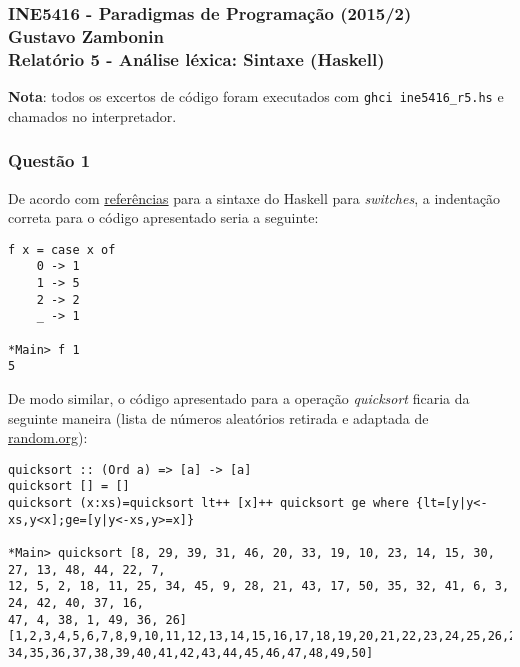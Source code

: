 \documentclass{article}
\begin{document}
\subsubsection*{INE5416 - Paradigmas de Programação (2015/2) \\
    Gustavo Zambonin \\
    Relatório 5 - Análise léxica: Sintaxe (Haskell)
}

\textbf{Nota}: todos os excertos de código foram executados com \texttt{ghci ine5416\_r5.hs} e chamados no interpretador.

\subsubsection*{Questão 1}
De acordo com \href{http://rigaux.org/language-study/syntax-across-languages/CntrFlow.html}{referências} para a sintaxe do Haskell para \textit{switches}, a indentação correta para o código apresentado seria a seguinte:
\begin{verbatim}
f x = case x of
    0 -> 1
    1 -> 5
    2 -> 2
    _ -> 1

*Main> f 1
5
\end{verbatim}
De modo similar, o código apresentado para a operação \textit{quicksort} ficaria da seguinte maneira (lista de números aleatórios retirada e adaptada de \href{https://random.org/integer-sets/?sets=1&num=50&min=1&max=50&commas=on&order=index&format=plain}{random.org}):
\begin{verbatim}
quicksort :: (Ord a) => [a] -> [a]
quicksort [] = []
quicksort (x:xs)=quicksort lt++ [x]++ quicksort ge where {lt=[y|y<-xs,y<x];ge=[y|y<-xs,y>=x]}

*Main> quicksort [8, 29, 39, 31, 46, 20, 33, 19, 10, 23, 14, 15, 30, 27, 13, 48, 44, 22, 7,
12, 5, 2, 18, 11, 25, 34, 45, 9, 28, 21, 43, 17, 50, 35, 32, 41, 6, 3, 24, 42, 40, 37, 16,
47, 4, 38, 1, 49, 36, 26]
[1,2,3,4,5,6,7,8,9,10,11,12,13,14,15,16,17,18,19,20,21,22,23,24,25,26,27,28,29,30,31,32,33,
34,35,36,37,38,39,40,41,42,43,44,45,46,47,48,49,50]
\end{verbatim}
\end{document}
